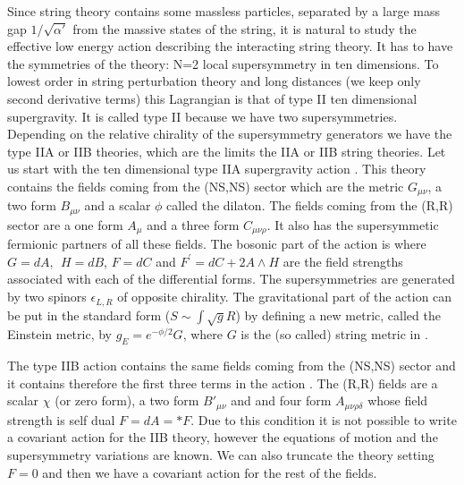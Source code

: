 Since string theory contains some massless particles, separated
by a large mass gap $ 1/\sqrt{\alpha'} $ from the massive
states of the string, it is natural to study 
the effective low energy  action describing the interacting
string theory.  It has to have the symmetries of the theory:
N=2 local supersymmetry in ten dimensions.
To lowest order in string perturbation theory and long
distances (we keep only second derivative terms) 
 this Lagrangian is that of type II 
ten dimensional supergravity. It is called  type II because we have two
supersymmetries. Depending on the relative chirality of
the supersymmetry generators we have the type IIA or IIB theories,
which are the limits the IIA or IIB  string theories.
Let us start with the 
ten dimensional type IIA supergravity action \twoasugra . 
This theory contains the fields coming from the 
 (NS,NS) sector  which are
the metric $G_{\mu\nu}$, a two form
$B_{\mu\nu}$  and a scalar
$\phi $  called the dilaton. The fields coming from the
(R,R) sector are 
 a one form $A_\mu$ and a  three form $ C_{\mu\nu\rho} $.
It also has
the supersymmetic fermionic partners of all
these fields.
The bosonic part of the action is
\eqn{}
where $G=dA,~~H=dB$,  $F=dC$ and $F^{\prime}=dC+2A\wedge H$ are
the field strengths
 associated with each of the differential forms.
The supersymmetries are generated by two spinors $\epsilon_{L,R}$ of
opposite chirality.
The gravitational part of the action can be put in the
standard form ($ S \sim \int \sqrt{g} R $) by defining a new metric, called
 the
Einstein metric, by $ g_E = e^{- \phi/2} G $, where $G$ is the 
(so called) string  
metric in \actiontwoa .




The type IIB action contains the same fields coming from the 
(NS,NS) sector and it contains therefore the first three
terms in the action \actiontwoa . The (R,R) fields are
a scalar
$\chi$ (or zero form), a two form
$B'_{\mu\nu} $ and
and four form $A_{\mu\nu\rho\delta}$ 
whose field strength is self dual $F= dA = * F$.
Due to this condition
 it is not possible to write a covariant action for
the IIB theory, however the equations of motion and
the supersymmetry variations are known.
We can also truncate the theory setting $F=0$ and then
we have a covariant  action for the rest of the fields.

